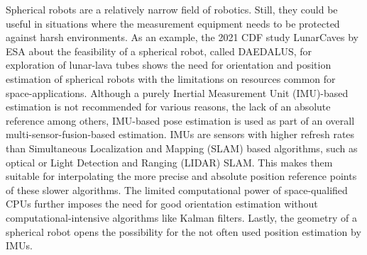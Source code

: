 \documentclass[letterpaper, 10 pt, conference]{ieeeconf}  %
\begin{document}
Spherical robots are a relatively narrow field of robotics. Still, they could be useful in situations where the measurement equipment needs to be protected against harsh environments.
As an example, the 2021 CDF study LunarCaves by ESA about the feasibility of a spherical robot, called DAEDALUS, for exploration of lunar-lava tubes \cite{rossi2021daedalus} shows the need for orientation and position estimation of spherical robots with the limitations on resources common for space-applications.
Although a purely Inertial Measurement Unit (IMU)-based estimation is not recommended for various reasons, the lack of an absolute reference among others, IMU-based pose estimation is used as part of an overall multi-sensor-fusion-based estimation.
IMUs are sensors with higher refresh rates than Simultaneous Localization and Mapping (SLAM) based algorithms, such as optical or Light Detection and Ranging (LIDAR) SLAM. This makes them suitable for interpolating the more precise and absolute position reference points of these slower algorithms.
The limited computational power of space-qualified CPUs further imposes the need for good orientation estimation without computational-intensive algorithms like Kalman filters.
Lastly, the geometry of a spherical robot opens the possibility for the not often used position estimation by IMUs.
\end{document}
